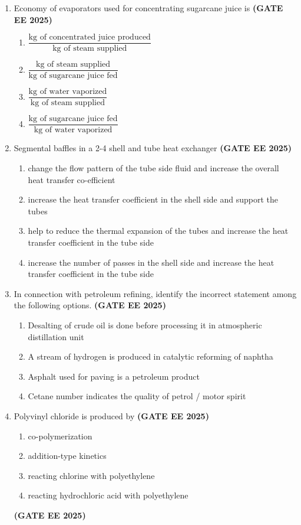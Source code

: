 \documentclass[journal,12pt,onecolumn]{IEEEtran}
\theoremstyle{remark}
\begin{document}
\begin{enumerate}
\item Economy of evaporators used for concentrating sugarcane juice is 
\hfill \textbf{(GATE EE 2025)} \begin{enumerate}
    \item $\dfrac{\text{kg of concentrated juice produced}}{\text{kg of steam supplied}}$
    \item $\dfrac{\text{kg of steam supplied}}{\text{kg of sugarcane juice fed}}$
    \item $\dfrac{\text{kg of water vaporized}}{\text{kg of steam supplied}}$
    \item $\dfrac{\text{kg of sugarcane juice fed}}{\text{kg of water vaporized}}$
\end{enumerate}

\item Segmental baffles in a 2-4 shell and tube heat exchanger
\hfill \textbf{(GATE EE 2025)} \begin{enumerate}
    \item change the flow pattern of the tube side fluid and increase the overall heat transfer co-efficient
    \item increase the heat transfer coefficient in the shell side and support the tubes
    \item help to reduce the thermal expansion of the tubes and increase the heat transfer coefficient in the tube side
    \item increase the number of passes in the shell side and increase the heat transfer coefficient in the tube side
\end{enumerate}


\item  In connection with petroleum refining, identify the incorrect statement among the following options.
\hfill \textbf{(GATE EE 2025)} \begin{enumerate}
    \item Desalting of crude oil is done before processing it in atmospheric distillation unit
    \item A stream of hydrogen is produced in catalytic reforming of naphtha
    \item Asphalt used for paving is a petroleum product
    \item Cetane number indicates the quality of petrol / motor spirit
\end{enumerate}


\item Polyvinyl chloride is produced by
\hfill \textbf{(GATE EE 2025)} \begin{enumerate}
    \item co-polymerization
    \item addition-type kinetics
    \item reacting chlorine with polyethylene
    \item reacting hydrochloric acid with polyethylene
\end{enumerate}
\hfill
\textbf{(GATE EE 2025)}


\end{enumerate}
\end{document}
